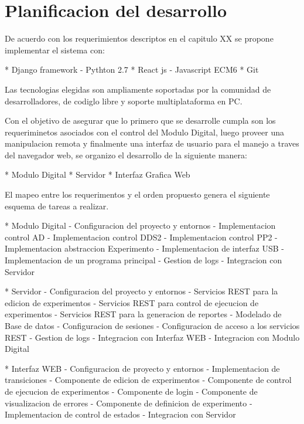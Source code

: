 \section{Planificacion del desarrollo}


De acuerdo con los requerimientos descriptos en el capitulo XX se propone implementar el sistema
con:

    * Django framework - Pythton 2.7
    * React js - Javascript ECM6
    * Git

Las tecnologias elegidas son ampliamente soportadas por la comunidad de desarrolladores, de codiglo libre y soporte multiplataforma en PC.

Con el objetivo de asegurar que lo primero que se desarrolle cumpla son los requeriminetos asociados 
con el control del Modulo Digital, luego proveer una manipulacion remota y finalmente una interfaz de
usuario para el manejo a traves del navegador web, se organizo el desarrollo de la siguiente manera:

    * Modulo Digital
    * Servidor 
    * Interfaz Grafica Web

El mapeo entre los requerimentos y el orden propuesto genera el siguiente esquema de tareas a realizar.

    * Modulo Digital
        - Configuracion del proyecto y entornos
        - Implementacion control AD 
        - Implementacion control DDS2
        - Implementacion control PP2
        - Implementacion abstraccion Experimento
        - Implementacion de interfaz USB
        - Implementacion de un programa principal
        - Gestion de logs
        - Integracion con Servidor

    * Servidor
        - Configuracion del proyecto y entornos
        - Servicios REST para la edicion de experimentos
        - Servicios REST para control de ejecucion de experimentos
        - Servicios REST para la generacion de reportes
        - Modelado de Base de datos 
        - Configuracion de sesiones
        - Configuracion de acceso a los servicios REST
        - Gestion de logs
        - Integracion con Interfaz WEB
        - Integracion con Modulo Digital
    
    * Interfaz WEB
        - Configuracion de proyecto y entornos
        - Implementacion de transiciones
        - Componente de edicion de experimentos
        - Componente de control de ejecucion de experimentos
        - Componente de login
        - Componente de visualizacion de errores
        - Componente de definicion de experimento
        - Implementacion de control de estados
        - Integracion con Servidor
